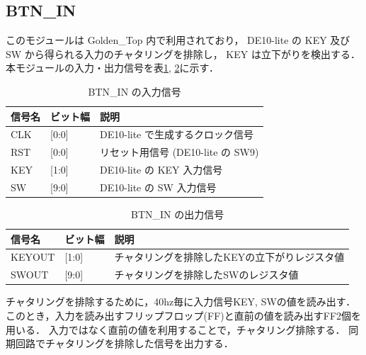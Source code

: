 \subsection{BTN\_IN}
このモジュールは Golden\_Top 内で利用されており，
DE10-lite の KEY 及び SW から得られる入力のチャタリングを排除し，
KEY は立下がりを検出する．
本モジュールの入力・出力信号を表\ref{tab:btn_in_input}, \ref{tab:btn_in_output}に示す．
\begin{table}[h]
  \caption{BTN\_IN の入力信号}
  \centering
  \begin{tabular}{l|l|l}
    信号名 & ビット幅 & 説明 \\
    \hline
    CLK & [0:0] & DE10-lite で生成するクロック信号 \\
    RST & [0:0] & リセット用信号 (DE10-lite の SW9) \\
    KEY & [1:0] & DE10-lite の KEY 入力信号 \\
    SW &  [9:0] & DE10-lite の SW 入力信号
  \end{tabular}
  \label{tab:btn_in_input}
\end{table}
\begin{table}[h]
  \caption{BTN\_IN の出力信号}
  \centering
  \begin{tabular}{l|l|l}
    信号名 & ビット幅 & 説明 \\
    \hline
    KEYOUT & [1:0] & チャタリングを排除したKEYの立下がりレジスタ値 \\
    SWOUT &  [9:0] & チャタリングを排除したSWのレジスタ値
  \end{tabular}
  \label{tab:btn_in_output}
\end{table}

チャタリングを排除するために，40hz毎に入力信号KEY, SWの値を読み出す．
このとき，入力を読み出すフリップフロップ(FF)と直前の値を読み出すFF2個を用いる．
入力ではなく直前の値を利用することで，チャタリング排除する．
同期回路でチャタリングを排除した信号を出力する．


